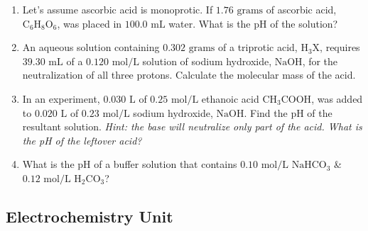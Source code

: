 \documentclass[12pt]{article}
\begin{document}
\begin{enumerate}[label=\arabic*.]
    \item Let's assume ascorbic acid is monoprotic. If $1.76\text{ grams}$ of ascorbic acid, $\text{C}_6\text{H}_8\text{O}_6$, was placed in $100.0\text{ mL}$ water. What is the pH of the solution?
    \vspace{3.5cm}

    \item An aqueous solution containing $0.302\text{ grams}$ of a triprotic acid, $\text{H}_3\text{X}$, requires $39.30\text{ mL}$ of a $0.120\text{ mol/L}$ solution of sodium hydroxide, $\text{NaOH}$, for the neutralization of all three protons. Calculate the molecular mass of the acid.
    \vspace{3.5cm}

    \item In an experiment, $0.030\text{ L}$ of $0.25\text{ mol/L}$ ethanoic acid $\text{CH}_3\text{COOH}$, was added to $0.020\text{ L}$ of $0.23\text{ mol/L}$ sodium hydroxide, $\text{NaOH}$. Find the pH of the resultant solution. \textit{Hint: the base will neutralize only part of the acid. What is the pH of the leftover acid?}
    \vspace{4.5cm}

    \item What is the pH of a buffer solution that contains $0.10\text{ mol/L}$ $\text{NaHCO}_3$ \& $0.12\text{ mol/L}$ $\text{H}_2\text{CO}_3$?
    \vspace{3.5cm}
\end{enumerate}

\newpage

\subsection*{Electrochemistry Unit}
\end{document}
